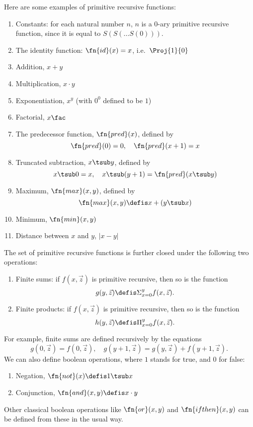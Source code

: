\documentclass[../../include/open-logic-section]{subfiles}
\begin{document}


Here are some examples of primitive recursive functions:
\begin{enumerate}
\item Constants: for each natural number $n$, $n$ is a 0-ary primitive
  recursive function, since it is equal to $S(S(\dots S(0)))$.

\item The identity function: $\fn{id}(x) = x$, i.e.\ $\Proj{1}{0}$

\item Addition, $x+y$

\item Multiplication, $x \cdot y$

\item Exponentiation, $x^y$ (with $0^0$ defined to be $1$)

\item Factorial, $x\fac$

\item The predecessor function, $\fn{pred}(x)$, defined by
\[
\fn{pred}(0) = 0, \quad \fn{pred}(x+1) = x
\]

\item Truncated subtraction, $x \tsub y$, defined by 
\[
x \tsub 0 = x, \quad x \tsub (y+1) = \fn{pred}(x \tsub y)
\]

\item Maximum, $\fn{max}(x,y)$, defined by 
\[
\fn{max}(x,y) \defis x + (y \tsub x)
\]

\item Minimum, $\fn{min}(x,y)$

\item Distance between $x$ and $y$, $\left|x-y\right|$
\end{enumerate}

The set of primitive recursive functions is further closed under the
following two operations:
\begin{enumerate}
\item Finite sums: if $f(x,\vec z)$ is primitive recursive, then so is the
function 
\[
g(y,\vec z) \defis \Sigma_{x = 0}^y f(x,\vec z).
\]
\item Finite products: if $f(x,\vec z)$ is primitive recursive, then so is the
function 
\[
h(y,\vec z) \defis \Pi_{x = 0}^y f(x,\vec z).
\]
\end{enumerate}
For example, finite sums are defined recursively by the equations
\[
g(0,\vec z) = f(0,\vec z), \quad g(y+1,\vec z) = g(y,\vec z) +
f(y+1,\vec z).
\]
We can also define boolean operations, where $1$ stands for true, and
$0$ for false:
\begin{enumerate}
\item Negation, $\fn{not}(x) \defis 1 \tsub x$
\item Conjunction, $\fn{and}(x,y) \defis x \cdot y$
\end{enumerate}
Other classical boolean operations like $\fn{or}(x,y)$ and
$\fn{ifthen}(x,y)$ can be defined from these in the usual way.
\end{document}
